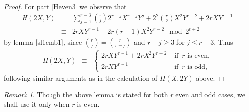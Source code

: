 \documentclass[11pt, reqno]{amsart}
\numberwithin{equation}{section}
\theoremstyle{definition}
\theoremstyle{remark}
\newtheorem{remark}[thm]{Remark}
\theoremstyle{definition}
\theoremstyle{remark}
\theoremstyle{remark}
\begin{document}
\begin{proof}
For part \eqref{Heven3} we observe that %
\begin{eqnarray*}
    H(2X,Y)&=& \sum_{j=1}^{r-3}{r \choose j}2^{r-j}X^{r-j}Y^{j}+2^2{r\choose 2}X^2Y^{r-2}+2rXY^{r-1} \\
    &\equiv& 2rXY^{r-1}+2r(r-1)X^2Y^{r-2} \mod 2^{t+2}
    \end{eqnarray*}
    by lemma \ref{sl1cmb1}, since ${r\choose j}={r\choose r-j}$ and $r-j\geq 3$ for $j\leq r-3$. Thus
    \begin{eqnarray*}
    H(2X,Y) &\equiv & \begin{cases}
     2rXY^{r-1}+ 2rX^{2}Y^{r-2} &\text{ if }\, r\text{ is even,}\\
     2rXY^{r-1} & \text{ if }\, r \text{ is odd,}
    \end{cases}
\end{eqnarray*}
following similar arguments as in the calculation of $H(X,2Y)$ above.
\end{proof}


\begin{remark}
Though the above lemma is stated for both $r$ even and odd cases, we shall use it only when $r$ is even. 
\end{remark}
\end{document}
